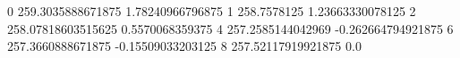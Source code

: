 0 259.3035888671875 1.78240966796875
1 258.7578125 1.23663330078125
2 258.07818603515625 0.5570068359375
4 257.2585144042969 -0.262664794921875
6 257.3660888671875 -0.15509033203125
8 257.52117919921875 0.0
